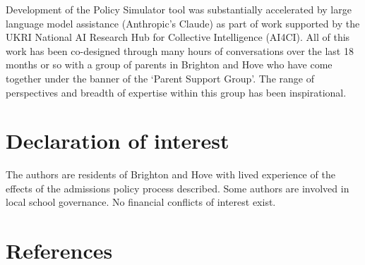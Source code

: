 \documentclass[
  12pt,
  titlepage]{article}
\begin{document}
Development of the Policy Simulator tool was substantially accelerated
by large language model assistance (Anthropic's Claude) as part of work
supported by the UKRI National AI Research Hub for Collective
Intelligence (AI4CI). All of this work has been co-designed through many
hours of conversations over the last 18 months or so with a group of
parents in Brighton and Hove who have come together under the banner of
the `Parent Support Group'. The range of perspectives and breadth of
expertise within this group has been inspirational.

\section*{Declaration of interest}\label{declaration-of-interest}

The authors are residents of Brighton and Hove with lived experience of
the effects of the admissions policy process described. Some authors are
involved in local school governance. No financial conflicts of interest
exist.

\section*{References}\label{references}
\end{document}
